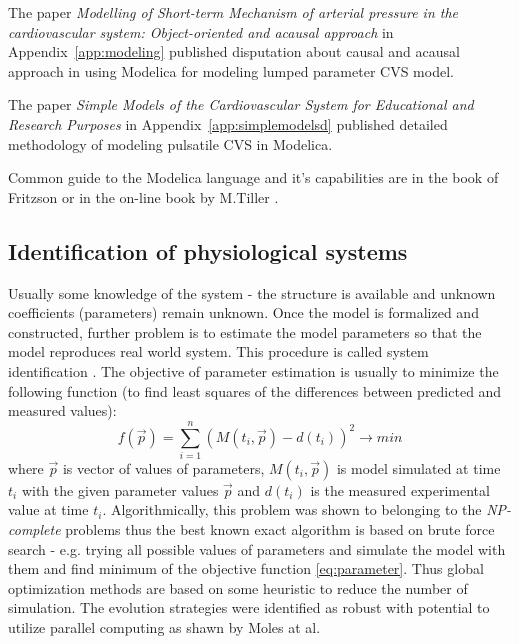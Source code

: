 The paper \cite{Kulhanek2014Modeling} \emph{Modelling of Short-term Mechanism of arterial pressure in the cardiovascular system: Object-oriented and acausal approach} in Appendix~\ref{app:modeling} published disputation about causal and acausal approach in using Modelica for modeling lumped parameter CVS model. 

The paper \cite{Kulhanek2014mefanet} \emph{Simple Models of the Cardiovascular System for Educational and Research Purposes} in Appendix~\ref{app:simplemodelsd} published detailed methodology of modeling pulsatile CVS in Modelica. 

Common guide to the Modelica language and it's capabilities are in the book of Fritzson \cite{fritzson2002} or in the on-line book by M.Tiller \cite{Tiller2014}.


\subsection{Identification of physiological systems}
\label{sec:estimation}

Usually some knowledge of the system - the structure is available and unknown coefficients (parameters) remain unknown. Once the model is formalized and constructed, further problem is to estimate the model parameters so that the model reproduces real world system. This procedure is called system identification \cite[p.~159]{khoo2000}. The objective of parameter estimation is usually to minimize the following function (to find least squares of the differences between predicted and measured values):
\begin{equation} \label{eq:parameter} 
f( \vec{p} ) = \sum_{i=1}^{n} ( M(t_{i},\vec{p} ) - d(t_{i}) )^2 \to min  
\end{equation} 
where $\vec{p}$ is vector of values of parameters, $M(t_{i},\vec{p})$ is model simulated at time $t_{i} $ with the given parameter values $\vec{p}$ and $d(t_{i})$ is the measured experimental value at time $t_{i}$.
Algorithmically, this problem was shown to belonging to the \emph{NP-complete} problems \cite{Hofmann2005} thus the best known exact algorithm is based on brute force search - e.g. trying all possible values of parameters and simulate the model with them and find minimum of the objective function \ref{eq:parameter}. Thus global optimization methods are based on some heuristic to reduce the number of simulation. The evolution strategies were identified as robust with potential to utilize parallel computing as shawn by Moles at al.\cite{Moles2003}

